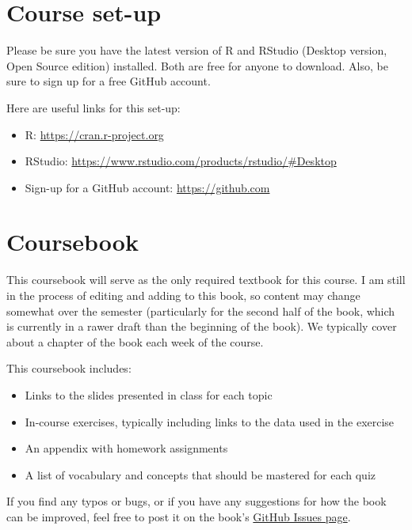 \documentclass[]{book}
\providecommand{\tightlist}{%
  \setlength{\itemsep}{0pt}\setlength{\parskip}{0pt}}
\theoremstyle{definition}
\theoremstyle{definition}
\theoremstyle{definition}
\theoremstyle{remark}
\begin{document}
\section{Course set-up}\label{course-set-up}

Please be sure you have the latest version of R and RStudio (Desktop
version, Open Source edition) installed. Both are free for anyone to
download. Also, be sure to sign up for a free GitHub account.

Here are useful links for this set-up:

\begin{itemize}
\tightlist
\item
  R: \url{https://cran.r-project.org}
\item
  RStudio: \url{https://www.rstudio.com/products/rstudio/\#Desktop}
\item
  Sign-up for a GitHub account: \url{https://github.com}
\end{itemize}

\section{Coursebook}\label{coursebook}

This coursebook will serve as the only required textbook for this
course. I am still in the process of editing and adding to this book, so
content may change somewhat over the semester (particularly for the
second half of the book, which is currently in a rawer draft than the
beginning of the book). We typically cover about a chapter of the book
each week of the course.

This coursebook includes:

\begin{itemize}
\tightlist
\item
  Links to the slides presented in class for each topic
\item
  In-course exercises, typically including links to the data used in the
  exercise
\item
  An appendix with homework assignments
\item
  A list of vocabulary and concepts that should be mastered for each
  quiz
\end{itemize}

If you find any typos or bugs, or if you have any suggestions for how
the book can be improved, feel free to post it on the book's
\href{https://github.com/geanders/RProgrammingForResearch/issues}{GitHub
Issues page}.
\end{document}
